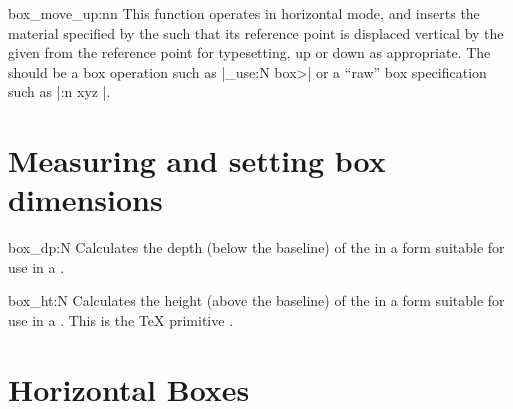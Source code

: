  \begin{docCommand}{box_move_up:nn}{  }
   This function operates in horizontal mode, and inserts the
   material specified by the 
   such that its reference point is displaced vertical by the given
    from the reference point for typesetting, up
   or down as appropriate. The  should be
   a box operation such as |\box_use:N \<box>| or a \enquote{raw}
   box specification such as |\vbox:n { xyz }|.
 \end{docCommand}
 

 \section{Measuring and setting box dimensions}

\begin{docCommand}{box_dp:N}{ }
   Calculates the depth (below the baseline) of the 
   in a form suitable for use in a .
\end{docCommand}

\begin{docCommand}{box_ht:N}{ }
   Calculates the height (above the baseline) of the 
   in a form suitable for use in a .
  This is the \TeX{} primitive .
 \end{docCommand}


\section{Horizontal Boxes}
\label{l3:hboxes}

